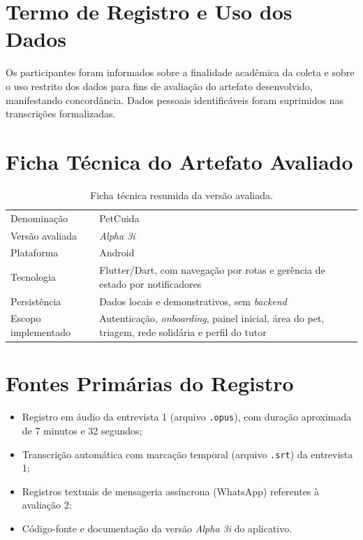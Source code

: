 \documentclass[12pt,a4paper]{article}
\begin{document}
\appendix
\section{Termo de Registro e Uso dos Dados}

Os participantes foram informados sobre a finalidade acadêmica da coleta e sobre o uso restrito dos dados para fins de avaliação do artefato desenvolvido, manifestando concordância. Dados pessoais identificáveis foram suprimidos nas transcrições formalizadas.

\section{Ficha Técnica do Artefato Avaliado}

\begin{table}[h!]
\centering
\small
\begin{tabular}{@{}>{\raggedright\arraybackslash}p{4.6cm}>{\raggedright\arraybackslash}p{9.0cm}@{}}
\toprule
Denominação & PetCuida \\
Versão avaliada & \textit{Alpha 3i} \\
Plataforma & Android \\
Tecnologia & Flutter/Dart, com navegação por rotas e gerência de estado por notificadores \\
Persistência & Dados locais e demonstrativos, sem \textit{backend} \\
Escopo implementado & Autenticação, \textit{onboarding}, painel inicial, área do pet, triagem, rede solidária e perfil do tutor \\
\bottomrule
\end{tabular}
\caption{Ficha técnica resumida da versão avaliada.}
\end{table}

\section{Fontes Primárias do Registro}

\begin{itemize}[leftmargin=*]
  \item Registro em áudio da entrevista 1 (arquivo \texttt{.opus}), com duração aproximada de 7 minutos e 32 segundos;
  \item Transcrição automática com marcação temporal (arquivo \texttt{.srt}) da entrevista 1;
  \item Registros textuais de mensageria assíncrona (WhatsApp) referentes à avaliação 2;
  \item Código-fonte e documentação da versão \textit{Alpha 3i} do aplicativo.
\end{itemize}
\end{document}
